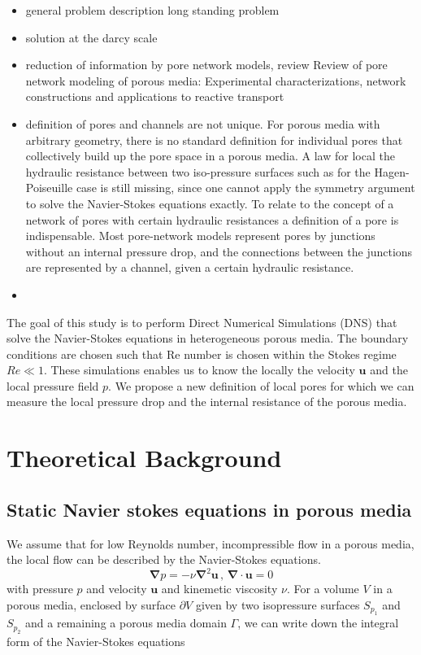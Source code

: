 \documentclass[draft]{agujournal2019}
\begin{document}
\begin{itemize}
	\item general problem description long standing problem 
	\item solution at the darcy scale
	\item reduction of information by pore network models, review Review of pore network modeling of porous media: Experimental characterizations, network constructions and applications to reactive transport
	\item definition of pores and channels are not unique. 
	For porous media with arbitrary geometry, there is no standard definition for individual pores that collectively build up the pore space in a porous media. A law for local the hydraulic resistance between two iso-pressure surfaces such as for the Hagen-Poiseuille case is still missing, since one cannot apply the symmetry argument to solve the Navier-Stokes equations exactly. To relate to the concept of a network of pores with certain hydraulic resistances a definition of a pore is indispensable. Most pore-network models represent pores by junctions without an internal pressure drop, and the connections between the junctions are represented by a channel, given a certain hydraulic resistance. 
	\item 
\end{itemize}

The goal of this study is to perform Direct Numerical Simulations (DNS) that solve the Navier-Stokes equations in heterogeneous porous media. The boundary conditions are chosen such that Re number is chosen within the Stokes regime $Re\ll1$. These simulations enables us to know the locally the velocity $\mathbf{u}$ and the local pressure field $p$. We propose a new definition of local pores for which we can measure the local pressure drop and the internal resistance of the porous media. 



\section{Theoretical Background}
\subsection{Static Navier stokes equations in porous media}
We assume that for low Reynolds number, incompressible flow in a porous media, the local flow can be described by the Navier-Stokes equations. 
\begin{equation}\label{eq:stokes_local}
	\mathbf{\nabla} p = - \nu\mathbf{\nabla}^2 \mathbf{u}\,,\,\mathbf{\nabla}\cdot\mathbf{u}=0
	\end{equation}
with pressure $p$ and velocity $\mathbf{u}$ and kinemetic viscosity $\nu$. 
For a volume $V$ in a porous media, enclosed by surface $\partial V$ given by two isopressure surfaces $S_{p_1}$ and $S_{p_2}$ and a remaining a porous media domain $\Gamma$, we can write down the integral form of the Navier-Stokes equations
\end{document}
